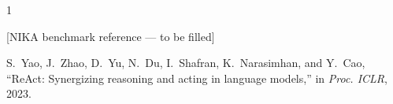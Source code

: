 \documentclass[conference]{IEEEtran}
\begin{document}


\begin{thebibliography}{1}

[NIKA benchmark reference --- to be filled]

S.~Yao, J.~Zhao, D.~Yu, N.~Du, I.~Shafran, K.~Narasimhan, and Y.~Cao, ``ReAct: Synergizing reasoning and acting in language models,'' in \emph{Proc. ICLR}, 2023.

\end{thebibliography}
\end{document}
